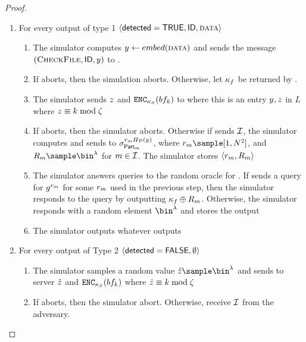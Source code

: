\begin{proof}
\begin{itemize}
\begin{enumerate}[resume]
\item For every output of type 1 $\langle \detected = \tru, \genericFileID, \clientData \rangle$
\begin{enumerate}
\item The simulator computes $\genericCInputElmt \assign \embed(\clientData)$ and sends the message $(\checkContent, \genericFileID, \genericCInputElmt)$ to \contentModFunc. 
\item If \contentModFunc aborts, then the simulation aborts. Otherwise, let $\kappa_{f}$ be returned by \contentModFunc. 
\item The simulator sends $z$ and $\encrypt[\bloomFilterKey](\bloomFilter[\bloomFilterIdx])$ to \server where this is an entry $\genericCInputElmt, \genericCInputElmtPRFEval$ in $L$ where $z \equiv k \bmod \zeta$ 
\item If \server aborts, then the simulator aborts. Otherwise if \server sends $\mathcal{I}$, the simulator computes and sends to \server $\genericSig[\partition{\partitionIdx}]^{\genericRand_\partitionIdx \primeRO(\genericCInputElmt)}$, where $\genericRand_\partitionIdx \sample [1, \rsaMod^2]$, and $R_\partitionIdx \sample \bin^{\secParam}$ for $m \in \mathcal{I}$. The simulator stores $\langle \genericRand_\partitionIdx, R_\partitionIdx \rangle$
\item The simulator answers queries to the random oracle \ro for \server. If \server sends a query for $\qrGen^{\genericRand_\partitionIdx}$ for some $\genericRand_\partitionIdx$ used in the previous step, then the simulator responds to the query by outputting $\kappa_{f} \oplus R_m$. Otherwise, the simulator responds with a random element $\bin^{\secParam}$ and stores the output
\item The simulator outputs whatever \server outputs
\end{enumerate}
\item For every output of Type 2 $\langle \mathsf{detected} = \mathsf{FALSE}, \emptyset \rangle$
\begin{enumerate}
\item The simulator samples a random value $\hat{\genericCInputElmtPRFEval} \sample \bin^{\secParam}$ and sends to server $\hat{z}$ and $\encrypt[\bloomFilterKey](\bloomFilter[\bloomFilterIdx])$ where $\hat{z} \equiv k \bmod \zeta$ 
\item If \server aborts, then the simulator abort. Otherwise, receive $\mathcal{I}$ from the adversary. 

\end{enumerate}
\end{enumerate}
\end{itemize}
\end{proof}
